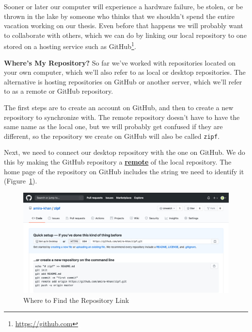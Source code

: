 \documentclass[
]{krantz}
\renewenvironment{quote}{\begin{VF}}{\end{VF}}
\renewcommand{\href}[2]{#2\footnote{\url{#1}}}
\newcommand{\gref}[2]{\hyperlink{#2}{\textbf{#1}}}
\begin{document}
Sooner or later our computer will experience a hardware failure,
be stolen,
or be thrown in the lake by someone who thinks that
we shouldn't spend the entire vacation working on our thesis.
Even before that happens
we will probably want to collaborate with others,
which we can do by linking our local repository
to one stored on a hosting service such as \href{https://github.com}{GitHub}.

\begin{quote}
\textbf{Where's My Repository?}
So far we've worked with repositories located on your own computer,
which we'll also refer to as local or desktop repositories.
The alternative is hosting repositories on GitHub or another server,
which we'll refer to as a remote or GitHub repository.
\end{quote}

The first steps are to create an account on GitHub,
and then to create a new repository to synchronize with.
The remote repository doesn't have to have the same name as the local one,
but we will probably get confused if they are different,
so the repository we create on GitHub will also be called \texttt{zipf}.

Next,
we need to connect our desktop repository with the one on GitHub.
We do this by making the GitHub repository a \gref{remote}{remote\_repository}
of the local repository.
The home page of the repository on GitHub includes the string we need to identify it
(Figure~\ref{fig:git-cmdline-repo-link}).

\begin{figure}

{\centering \includegraphics[width=1\linewidth]{figures/git-cmdline/repo-link} 

}

\caption{Where to Find the Repository Link}\label{fig:git-cmdline-repo-link}
\end{figure}
\end{document}
